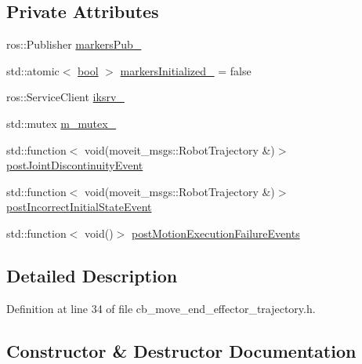 \subsection*{Private Attributes}
\begin{DoxyCompactItemize}
\item 
ros\+::\+Publisher \hyperlink{classcl__move__group__interface_1_1CbMoveEndEffectorTrajectory_aabc2216b2d8625fecd83c5ec69928e63}{markers\+Pub\+\_\+}
\item 
std\+::atomic$<$ \hyperlink{classbool}{bool} $>$ \hyperlink{classcl__move__group__interface_1_1CbMoveEndEffectorTrajectory_ac140a7f0adfb20f1e2900a5c8cd2ca5b}{markers\+Initialized\+\_\+} = false
\item 
ros\+::\+Service\+Client \hyperlink{classcl__move__group__interface_1_1CbMoveEndEffectorTrajectory_a8a2e2225a5b53325241e45e4e28fa3a7}{iksrv\+\_\+}
\item 
std\+::mutex \hyperlink{classcl__move__group__interface_1_1CbMoveEndEffectorTrajectory_a2a98ef725cb3fc7f61654d3d6a2066bb}{m\+\_\+mutex\+\_\+}
\item 
std\+::function$<$ void(moveit\+\_\+msgs\+::\+Robot\+Trajectory \&)$>$ \hyperlink{classcl__move__group__interface_1_1CbMoveEndEffectorTrajectory_a308331beab9b2ec0eae72fa56fa999c9}{post\+Joint\+Discontinuity\+Event}
\item 
std\+::function$<$ void(moveit\+\_\+msgs\+::\+Robot\+Trajectory \&)$>$ \hyperlink{classcl__move__group__interface_1_1CbMoveEndEffectorTrajectory_a6180230347c922fa0d85f514ce5029df}{post\+Incorrect\+Initial\+State\+Event}
\item 
std\+::function$<$ void()$>$ \hyperlink{classcl__move__group__interface_1_1CbMoveEndEffectorTrajectory_a72c4a469b70617dc5ea75e225a013582}{post\+Motion\+Execution\+Failure\+Events}
\end{DoxyCompactItemize}


\subsection{Detailed Description}


Definition at line 34 of file cb\+\_\+move\+\_\+end\+\_\+effector\+\_\+trajectory.\+h.



\subsection{Constructor \& Destructor Documentation}
\mbox{\label{classcl__move__group__interface_1_1CbMoveEndEffectorTrajectory_af7e718b0c53e912fd74968abbb0a4810}} 
